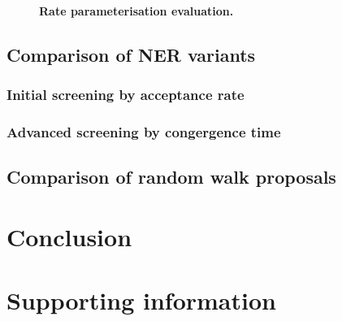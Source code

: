 \documentclass[10pt,letterpaper]{article}
\begin{document}
\begin{figure}[!h]
\caption{\textbf{Rate parameterisation evaluation.} }
\label{fig:parameterisationResults}
\end{figure}








\subsection*{Comparison of NER variants}



\subsubsection*{Initial screening by acceptance rate}


\subsubsection*{Advanced screening by congergence time}


\subsection*{Comparison of random walk proposals}



\section*{Conclusion}



\section*{Supporting information}
\end{document}
